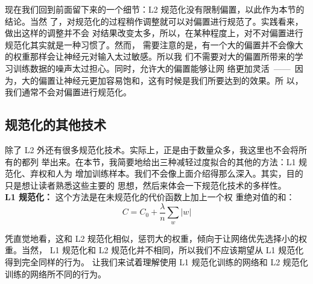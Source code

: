 现在我们回到前面留下来的一个细节：L2 规范化没有限制偏置，以此作为本节的结论。当然
了，对规范化的过程稍作调整就可以对偏置进行规范了。实践看来，做出这样的调整并不会
对结果改变太多，所以，在某种程度上，对不对偏置进行规范化其实就是一种习惯了。然而，
需要注意的是，有一个大的偏置并不会像大的权重那样会让神经元对输入太过敏感。所以我
们不需要对大的偏置所带来的学习训练数据的噪声太过担心。同时，允许大的偏置能够让网
络更加灵活~——~因为，大的偏置让神经元更加容易饱和，这有时候是我们所要达到的效果。所
以，我们通常不会对偏置进行规范化。

\subsection{规范化的其他技术}

除了 L2 外还有很多规范化技术。实际上，正是由于数量众多，我这里也不会将所有的都列
举出来。在本节，我简要地给出三种减轻过度拟合的其他的方法：L1 规范化、弃权和人为
增加训练样本。我们不会像上面介绍得那么深入。其实，目的只是想让读者熟悉这些主要的
思想，然后来体会一下规范化技术的多样性。\\

\textbf{L1 规范化：} 这个方法是在未规范化的代价函数上加上一个权
重绝对值的和：
\begin{equation}
  C = C_0 + \frac{\lambda}{n} \sum_w |w|
  \label{eq:95}\tag{95}
\end{equation}

凭直觉地看，这和 L2 规范化相似，惩罚大的权重，倾向于让网络优先选择小的权重。当然，
L1 规范化和 L2 规范化并不相同，所以我们不应该期望从 L1 规范化得到完全同样的行为。
让我们来试着理解使用 L1 规范化训练的网络和 L2 规范化训练的网络所不同的行为。

